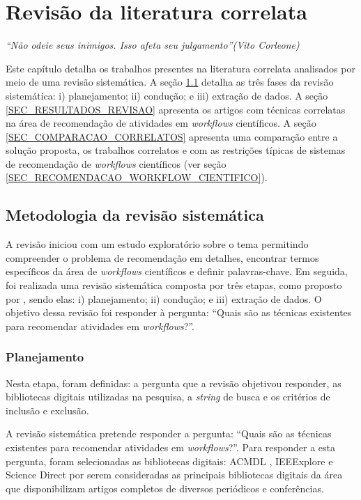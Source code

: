 \chapter{Revis{\~a}o da literatura correlata}\label{CAP_CORRELATOS}
\begin{flushright}
	\textit{``Não odeie seus inimigos. Isso afeta seu julgamento''(Vito Corleone)}
\end{flushright}

Este capítulo detalha os trabalhos presentes na literatura correlata analisados por meio de uma revisão sistemática. A seção \ref{SEC_METODOLOGIA_REVISAO} detalha as três fases da revisão sistemática: i) planejamento; ii) condução; e iii) extração de dados. A seção \ref{SEC_RESULTADOS_REVISAO} apresenta os artigos com técnicas correlatas na área de recomendação de atividades em \emph{workflows} científicos. A seção \ref{SEC_COMPARACAO_CORRELATOS} apresenta uma comparação entre a solução proposta, os trabalhos correlatos e com as restrições típicas de sistemas de recomendação de \emph{workflows} científicos (ver seção \ref{SEC_RECOMENDACAO_WORKFLOW_CIENTIFICO}).

\section{Metodologia da revisão sistemática} \label{SEC_METODOLOGIA_REVISAO}
A revisão iniciou com um estudo exploratório sobre o tema permitindo compreender o problema de recomendação em detalhes, encontrar termos específicos da área de \emph{workflows} científicos e definir palavras-chave. Em seguida, foi realizada uma revisão sistemática  composta por três etapas, como proposto por , sendo elas: i) planejamento; ii) condução; e iii) extração de dados. O objetivo dessa revisão foi responder à pergunta: ``Quais são as técnicas existentes para recomendar atividades em \emph{workflows}?''.

\subsection{Planejamento}
Nesta etapa, foram definidas: a pergunta que a revisão objetivou responder, as bibliotecas digitais utilizadas na pesquisa, a \emph{string} de busca e os critérios de inclusão e exclusão.

A revisão sistemática pretende responder a pergunta: ``Quais são as técnicas existentes para recomendar atividades em \emph{workflows}?''. Para responder a esta pergunta, foram selecionadas as bibliotecas digitais: ACMDL \cite{ACMDL}, IEEExplore \cite{IEEEXPLORE} e Science Direct \cite{ScienceDirect} por serem consideradas as principais bibliotecas digitais da área que disponibilizam artigos completos de diversos periódicos e conferências.

